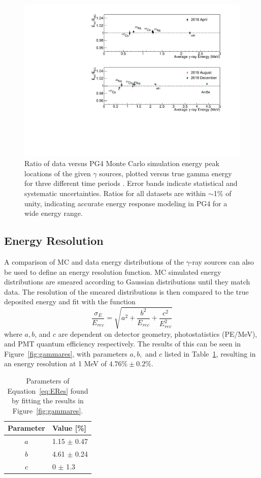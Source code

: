 \begin{figure}[h]
	\centering
	\includegraphics[width=0.7\linewidth]{tex/5-analysis-images/GammaScale}
	\caption{Ratio of data versus PG4 Monte Carlo simulation energy peak locations of the given $\gamma$ sources, plotted versus true gamma energy for three different time periods \cite{XZhang:2815}. Error bands indicate statistical and systematic uncertainties. Ratios for all datasets are within $\sim$1\% of unity, indicating accurate energy response modeling in PG4 for a wide energy range.}
	\label{fig:gammascale}
\end{figure}

\subsection{Energy Resolution}

A comparison of MC and data energy distributions of the $\gamma$-ray sources can also be used to define an energy resolution function. 
MC simulated energy distributions are smeared according to Gaussian distributions until they match data. 
The resolution of the smeared distributions is then compared to the true deposited energy and fit with the function
\begin{equation}
	\frac{\sigma_E}{E_{rec}} = \sqrt{a^2 + \frac{b^2}{E_{rec}} + \frac{c^2}{E^2_{rec}}}
	\label{eq:ERes}
\end{equation}
where $a, b$, and $c$ are dependent on detector geometry, photostatistics (PE/MeV), and PMT quantum efficiency respectively. 
The results of this can be seen in Figure~\ref{fig:gammares}, with parameters $a, b,$ and $c$ listed in Table~\ref{tab:MCResValues}, resulting in an energy resolution at 1 MeV of $4.76\%\pm0.2\%$.

\begin{table}[b]
	\centering
\begin{tabular}{c|l}
	\hline 
	\textbf{Parameter} & \textbf{Value [\%]} \\ 
	\hline 
	$a$ & 1.15 $\pm$ 0.47 \\ 
	$b$ & 4.61 $\pm$ 0.24 \\ 
	$c$ & 0 $\pm$ 1.3 \\ 
	\hline 
\end{tabular} 
\caption{Parameters of Equation~\ref{eq:ERes} found by fitting the results in Figure~\ref{fig:gammares}.}
\label{tab:MCResValues}
\end{table}


